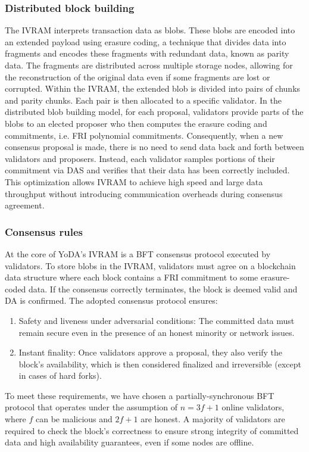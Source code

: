 \documentclass[11pt]{article}
\begin{document}
\subsubsection{Distributed block building}
The IVRAM interprets transaction data as blobs. These blobs are encoded into an extended payload using erasure coding, a technique that divides data into fragments and encodes these fragments with redundant data, known as parity data. The fragments are distributed across multiple storage nodes, allowing for the reconstruction of the original data even if some fragments are lost or corrupted.
%
Within the IVRAM, the extended blob is divided into pairs of chunks and parity chunks. Each pair is then allocated to a specific validator. In the distributed blob building model, for each proposal, validators provide parts of the blobs to an elected proposer who then computes the erasure coding and commitments, i.e. FRI polynomial commitments. Consequently, when a new consensus proposal is made, there is no need to send data back and forth between validators and proposers. Instead, each validator samples portions of their commitment via DAS and verifies that their data has been correctly included. This optimization allows IVRAM to achieve high speed and large data throughput without introducing communication overheads during consensus agreement.

\subsubsection{Consensus rules}
At the core of YoDA’s IVRAM is a BFT consensus protocol executed by validators. To store blobs in the IVRAM, validators must agree on a blockchain data structure where each block contains a FRI commitment to some erasure-coded data. If the consensus correctly terminates, the block is deemed valid and DA is confirmed. The adopted consensus protocol ensures:
\begin{enumerate}
    \item Safety and liveness under adversarial conditions: The committed data must remain secure even in the presence of an honest minority or network issues.
    \item Instant finality: Once validators approve a proposal, they also verify the block’s availability, which is then considered finalized and irreversible (except in cases of hard forks).
\end{enumerate}

To meet these requirements, we have chosen a partially-synchronous BFT protocol that operates under the assumption of $n=3f+1$ online validators, where $f$ can be malicious and $2f+1$ are honest. A majority of validators are required to check the block’s correctness to ensure strong integrity of committed data and high availability guarantees, even if some nodes are offline.
\end{document}
